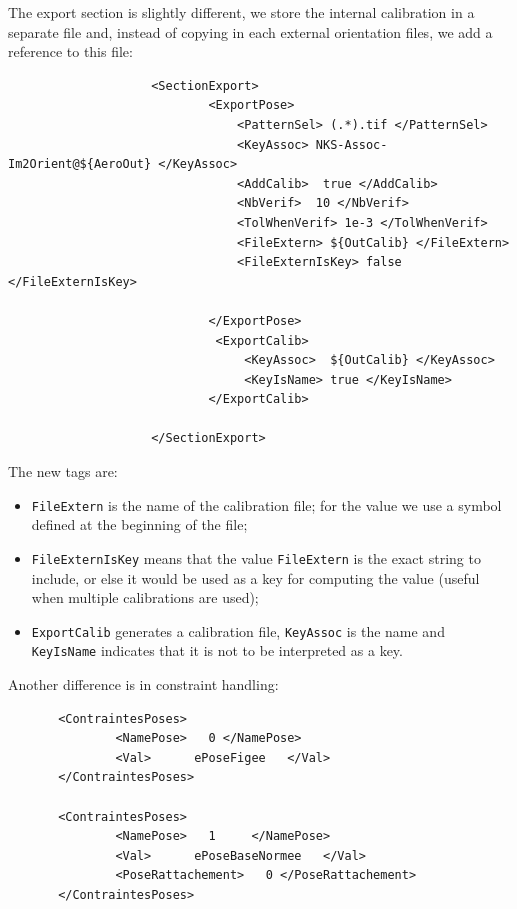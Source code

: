 The export section is slightly different, we store the internal calibration
in a separate file and, instead of copying in each external orientation files,
we add a reference to this file:

{\scriptsize
\begin{verbatim}
                    <SectionExport>
                            <ExportPose>
                                <PatternSel> (.*).tif </PatternSel>
                                <KeyAssoc> NKS-Assoc-Im2Orient@${AeroOut} </KeyAssoc>
                                <AddCalib>  true </AddCalib>
                                <NbVerif>  10 </NbVerif>
                                <TolWhenVerif> 1e-3 </TolWhenVerif>
                                <FileExtern> ${OutCalib} </FileExtern>
                                <FileExternIsKey> false </FileExternIsKey>

                            </ExportPose>
                             <ExportCalib>
                                 <KeyAssoc>  ${OutCalib} </KeyAssoc>
                                 <KeyIsName> true </KeyIsName>
                            </ExportCalib>

                    </SectionExport>
\end{verbatim}
}

The new tags are:

\begin{itemize}
   \item {\tt FileExtern} is the name of the calibration file; for the value  we
         use a symbol defined at the beginning of the file;

   \item {\tt FileExternIsKey} means that the value {\tt FileExtern} is the exact
         string to include, or else it would be used as a key for computing the value
         (useful when multiple calibrations are used);

   \item {\tt ExportCalib} generates a calibration file, {\tt KeyAssoc} is the name
         and {\tt KeyIsName} indicates that it is not to be interpreted as a key.
\end{itemize}


Another difference is in constraint handling:

{\scriptsize
\begin{verbatim}
       <ContraintesPoses>
               <NamePose>   0 </NamePose>
               <Val>      ePoseFigee   </Val>
       </ContraintesPoses>

       <ContraintesPoses>
               <NamePose>   1     </NamePose>
               <Val>      ePoseBaseNormee   </Val>
               <PoseRattachement>   0 </PoseRattachement>
       </ContraintesPoses>
\end{verbatim}
}

